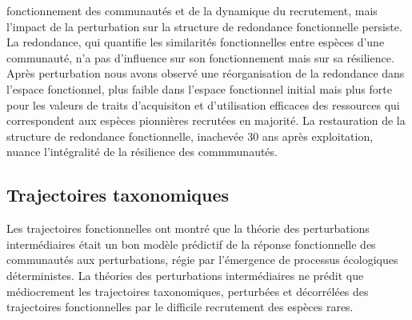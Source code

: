 \documentclass[
  11pt,
  french,
  A4paper,
  extrafontsizes,onecolumn,openright
  ]{memoir}
\begin{document}
fonctionnement des communautés et de la dynamique du recrutement, mais
l'impact de la perturbation sur la structure de redondance fonctionnelle
persiste. La redondance, qui quantifie les similarités fonctionnelles
entre espèces d'une communauté, n'a pas d'influence sur son
fonctionnement mais sur sa résilience. Après perturbation nous avons
observé une réorganisation de la redondance dans l'espace fonctionnel,
plus faible dans l'espace fonctionnel initial mais plus forte pour les
valeurs de traits d'acquisiton et d'utilisation efficaces des ressources
qui correspondent aux espèces pionnières recrutées en majorité. La
restauration de la structure de redondance fonctionnelle, inachevée 30
ans après exploitation, nuance l'intégralité de la résilience des
commmunautés.

\subsection{Trajectoires taxonomiques}\label{trajectoires-taxonomiques}

Les trajectoires fonctionnelles ont montré que la théorie des
perturbations intermédiaires était un bon modèle prédictif de la réponse
fonctionnelle des communautés aux perturbations, régie par l'émergence
de processus écologiques déterministes. La théories des perturbations
intermédiaires ne prédit que médiocrement les trajectoires taxonomiques,
perturbées et décorrélées des trajectoires fonctionnelles par le
difficile recrutement des espèces rares.
\end{document}
